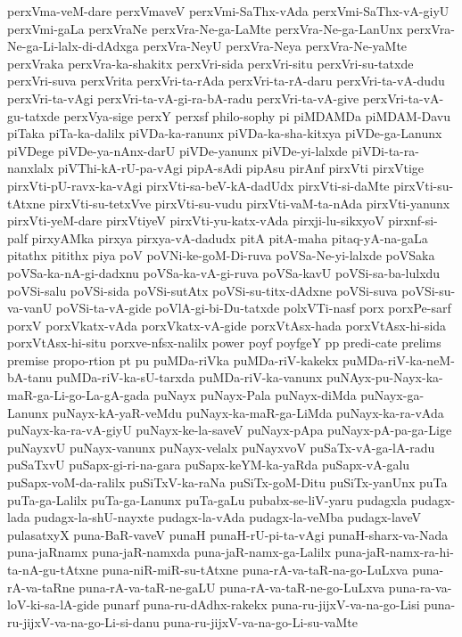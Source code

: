 {perxVma-veM-dare
perxVmaveV
perxVmi-SaThx-vAda
perxVmi-SaThx-vA-giyU
perxVmi-gaLa
perxVraNe
perxVra-Ne-ga-LaMte
perxVra-Ne-ga-LanUnx
perxVra-Ne-ga-Li-lalx-di-dAdxga
perxVra-NeyU
perxVra-Neya
perxVra-Ne-yaMte
perxVraka
perxVra-ka-shakitx
perxVri-sida
perxVri-situ
perxVri-su-tatxde
perxVri-suva
perxVrita
perxVri-ta-rAda
perxVri-ta-rA-daru
perxVri-ta-vA-dudu
perxVri-ta-vAgi
perxVri-ta-vA-gi-ra-bA-radu
perxVri-ta-vA-give
perxVri-ta-vA-gu-tatxde
perxVya-sige
perxY
perxsf
philo-sophy
pi
piMDAMDa
piMDAM-Davu
piTaka
piTa-ka-dalilx
piVDa-ka-ranunx
piVDa-ka-sha-kitxya
piVDe-ga-Lanunx
piVDege
piVDe-ya-nAnx-darU
piVDe-yanunx
piVDe-yi-lalxde
piVDi-ta-ra-nanxlalx
piVThi-kA-rU-pa-vAgi
pipA-sAdi
pipAsu
pirAnf
pirxVti
pirxVtige
pirxVti-pU-ravx-ka-vAgi
pirxVti-sa-beV-kA-dadUdx
pirxVti-si-daMte
pirxVti-su-tAtxne
pirxVti-su-tetxVve
pirxVti-su-vudu
pirxVti-vaM-ta-nAda
pirxVti-yanunx
pirxVti-yeM-dare
pirxVtiyeV
pirxVti-yu-katx-vAda
pirxji-lu-sikxyoV
pirxnf-si-palf
pirxyAMka
pirxya
pirxya-vA-dadudx
pitA
pitA-maha
pitaq-yA-na-gaLa
pitathx
pitithx
piya
poV
poVNi-ke-goM-Di-ruva
poVSa-Ne-yi-lalxde
poVSaka
poVSa-ka-nA-gi-dadxnu
poVSa-ka-vA-gi-ruva
poVSa-kavU
poVSi-sa-ba-lulxdu
poVSi-salu
poVSi-sida
poVSi-sutAtx
poVSi-su-titx-dAdxne
poVSi-suva
poVSi-su-va-vanU
poVSi-ta-vA-gide
poVlA-gi-bi-Du-tatxde
polxVTi-nasf
porx
porxPe-sarf
porxV
porxVkatx-vAda
porxVkatx-vA-gide
porxVtAsx-hada
porxVtAsx-hi-sida
porxVtAsx-hi-situ
porxve-nfsx-nalilx
power
poyf
poyfgeY
pp
predi-cate
prelims
premise
propo-rtion
pt
pu
puMDa-riVka
puMDa-riV-kakekx
puMDa-riV-ka-neM-bA-tanu
puMDa-riV-ka-sU-tarxda
puMDa-riV-ka-vanunx
puNAyx-pu-Nayx-ka-maR-ga-Li-go-La-gA-gada
puNayx
puNayx-Pala
puNayx-diMda
puNayx-ga-Lanunx
puNayx-kA-yaR-veMdu
puNayx-ka-maR-ga-LiMda
puNayx-ka-ra-vAda
puNayx-ka-ra-vA-giyU
puNayx-ke-la-saveV
puNayx-pApa
puNayx-pA-pa-ga-Lige
puNayxvU
puNayx-vanunx
puNayx-velalx
puNayxvoV
puSaTx-vA-ga-lA-radu
puSaTxvU
puSapx-gi-ri-na-gara
puSapx-keYM-ka-yaRda
puSapx-vA-galu
puSapx-voM-da-ralilx
puSiTxV-ka-raNa
puSiTx-goM-Ditu
puSiTx-yanUnx
puTa
puTa-ga-Lalilx
puTa-ga-Lanunx
puTa-gaLu
pubabx-se-liV-yaru
pudagxla
pudagx-lada
pudagx-la-shU-nayxte
pudagx-la-vAda
pudagx-la-veMba
pudagx-laveV
pulasatxyX
puna-BaR-vaveV
punaH
punaH-rU-pi-ta-vAgi
punaH-sharx-va-Nada
puna-jaRnamx
puna-jaR-namxda
puna-jaR-namx-ga-Lalilx
puna-jaR-namx-ra-hi-ta-nA-gu-tAtxne
puna-niR-miR-su-tAtxne
puna-rA-va-taR-na-go-LuLxva
puna-rA-va-taRne
puna-rA-va-taR-ne-gaLU
puna-rA-va-taR-ne-go-LuLxva
puna-ra-va-loV-ki-sa-lA-gide
punarf
puna-ru-dAdhx-rakekx
puna-ru-jijxV-va-na-go-Lisi
puna-ru-jijxV-va-na-go-Li-si-danu
puna-ru-jijxV-va-na-go-Li-su-vaMte
}
